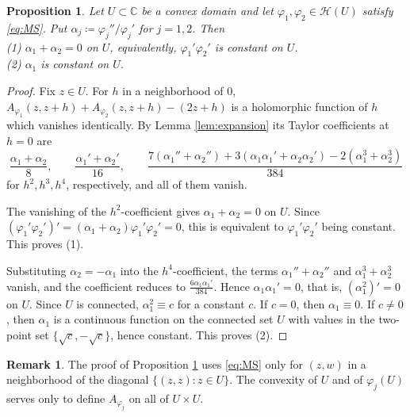 \documentclass[a4paper, reqno, 11pt]{amsart}
\newtheorem{Prop}[Thm]{Proposition}
\theoremstyle{definition}
\newtheorem{Rem}[Thm]{Remark}
\begin{document}
\begin{Prop}\label{prop:necessary}
Let $U \subset \mathbb{C}$ be a convex domain and let $\varphi_1, \varphi_2 \in \mathcal{H}(U)$ satisfy \eqref{eq:MS}.
Put $\alpha_j \coloneqq  \varphi_j''/\varphi_j'$ for $j = 1,2$.
Then \\
(1) $\alpha_1 + \alpha_2 = 0$ on $U$, equivalently, $\varphi_1' \varphi_2'$ is constant on $U$. \\
(2) $\alpha_1$ is constant on $U$.
\end{Prop}

\begin{proof}
Fix $z \in U$.
For $h$ in a neighborhood of $0$, 
$A_{\varphi_1}(z,z+h) + A_{\varphi_2}(z,z+h) - (2z+h)$ 
is a holomorphic function of $h$ which vanishes identically.
By Lemma \ref{lem:expansion} its Taylor coefficients at $h = 0$ are
\begin{equation*}
\frac{\alpha_1 + \alpha_2}{8}, \qquad \frac{\alpha_1' + \alpha_2'}{16}, \qquad \frac{7(\alpha_1'' + \alpha_2'') + 3(\alpha_1 \alpha_1' + \alpha_2 \alpha_2') - 2(\alpha_1^3 + \alpha_2^3)}{384}
\end{equation*}
for $h^2, h^3, h^4$, respectively, and all of them vanish.

The vanishing of the $h^2$-coefficient gives $\alpha_1 + \alpha_2 = 0$ on $U$.
Since $(\varphi_1'\varphi_2')' = (\alpha_1 + \alpha_2)\varphi_1'\varphi_2' = 0$, this is equivalent to $\varphi_1'\varphi_2'$ being constant.
This proves (1).

Substituting $\alpha_2 = -\alpha_1$ into the $h^4$-coefficient, the terms $\alpha_1'' + \alpha_2''$ and $\alpha_1^3 + \alpha_2^3$ vanish, and the coefficient reduces to $\frac{6 \alpha_1 \alpha_1'}{384}$.
Hence $\alpha_1 \alpha_1' = 0$, that is, $(\alpha_1^2)' = 0$ on $U$.
Since $U$ is connected, $\alpha_1^2 \equiv c$ for a constant $c$.
If $c = 0$, then $\alpha_1 \equiv 0$.
If $c \neq 0$, then $\alpha_1$ is a continuous function on the connected set $U$ with values in the two-point set $\{\sqrt{c}, -\sqrt{c}\}$, hence constant.
This proves (2).
\end{proof}

\begin{Rem}\label{rem:local}
The proof of Proposition \ref{prop:necessary} uses \eqref{eq:MS} only for $(z,w)$ in a neighborhood of the diagonal $\{(z,z) : z \in U\}$.
The convexity of $U$ and of $\varphi_j(U)$ serves only to define $A_{\varphi_j}$ on all of $U \times U$.
\end{Rem}
\end{document}
